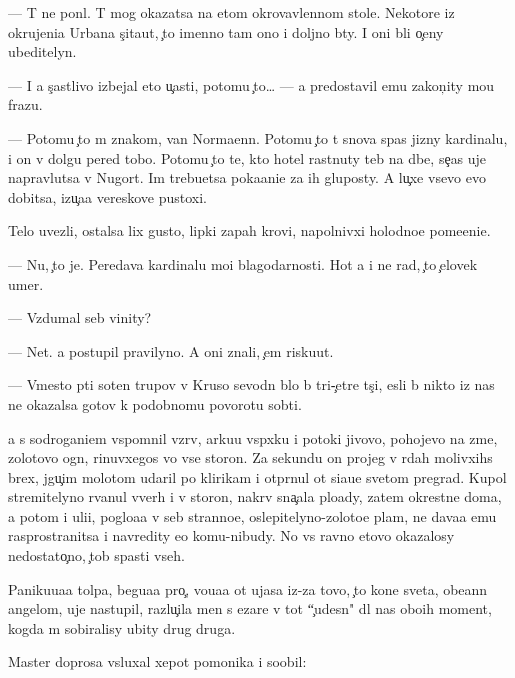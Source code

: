 \documentclass[10pt]{book}
\begin{document}
— T{\yi} ne pon{\ia}l. T{\yi} mog okazatsa na etom okrovavlennom stole. Nekotor{\yi}{\y}e iz okrujeni{\y}a Urbana s{\c}ita{\y}ut, {\c}to imenno tam ono i doljno b{\yi}ty. I oni b{\yi}li o{\c}eny ubeditelyn{\yi}.

— I {\y}a s{\c}astlivo izbejal eto{\y} u{\c}asti, potomu {\c}to… — {\Y}a predostavil {\y}emu zakon{\c}ity mo{\y}u frazu.

— Potomu {\c}to m{\yi} znakom{\yi}, van Norma{\y}enn. Potomu {\c}to t{\yi} snova spas jizny kardinalu, i on v dolgu pered tobo{\y}. Potomu {\c}to te, kto hotel rast{\ia}nuty teb{\ia} na d{\yi}be, se{\y}{\c}as uje napravl{\ia}{\y}utsa v N{\y}ugort. Im trebu{\y}etsa poka{\y}ani{\y}e za ih gluposty. A lu{\c}xe vsevo {\y}evo dobitsa, izu{\c}a{\y}a vereskov{\yi}{\y}e pustoxi.

Telo uvezli, ostalsa lix gusto{\y}, lipki{\y} zapah krovi, napolnivxi{\y} holodno{\y}e pome{\x}eni{\y}e.

— Nu, {\c}to je. Peredava{\y} kardinalu mo{\y}i blagodarnosti. Hot{\ia} {\y}a i ne rad, {\c}to {\c}elovek umer.

— Vzdumal seb{\ia} vinity?

— Net. {\Y}a postupil pravilyno. A oni znali, {\c}em risku{\y}ut.

— Vmesto p{\ia}ti soten trupov v Kruso sevodn{\ia} b{\yi}lo b{\yi} tri-{\c}et{\yi}re t{\yi}s{\ia}{\c}i, {\y}esli b{\yi} nikto iz nas ne okazalsa gotov k podobnomu povorotu sob{\yi}ti{\y}.

{\Y}a s sodrogani{\y}em vspomnil vzr{\yi}v, {\y}arku{\y}u vsp{\yi}xku i potoki jivovo, pohojevo na zme{\y}, zolotovo ogn{\ia}, rinuvxegos{\ia} vo vse storon{\yi}. Za sekundu on projeg v r{\ia}dah molivxihs{\ia} brex, jgu{\c}im molotom udaril po klirikam i otpr{\ia}nul ot si{\y}a{\y}u{\x}e{\y} svetom pregrad{\yi}. Kupol stremitelyno rvanul vverh i v storon{\yi}, nakr{\yi}v sna{\c}ala plo{\x}ady, zatem okrestn{\yi}{\y}e doma, a potom i uli{\q}i, poglo{\x}a{\y}a v seb{\ia} stranno{\y}e, oslepitelyno-zoloto{\y}e plam{\ia}, ne dava{\y}a {\y}emu rasprostranitsa i navredity {\y}e{\x}o komu-nibudy. No vs{\e} ravno etovo okazalosy nedostato{\c}no, {\c}tob{\yi} spasti vseh.

Paniku{\y}u{\x}a{\y}a tolpa, begu{\x}a{\y}a pro{\c}, vo{\y}u{\x}a{\y}a ot ujasa iz-za tovo, {\c}to kone{\q} sveta, obe{\x}ann{\yi}{\y} angelom, uje nastupil, razlu{\c}ila men{\ia} s {\C}ezare v tot ``{\c}udesn{\yi}{\y}" dl{\ia} nas obo{\y}ih moment, kogda m{\yi} sobiralisy ubity drug druga.

Master doprosa v{\yi}sluxal xepot pomo{\x}nika i soob{\x}il:
\end{document}
